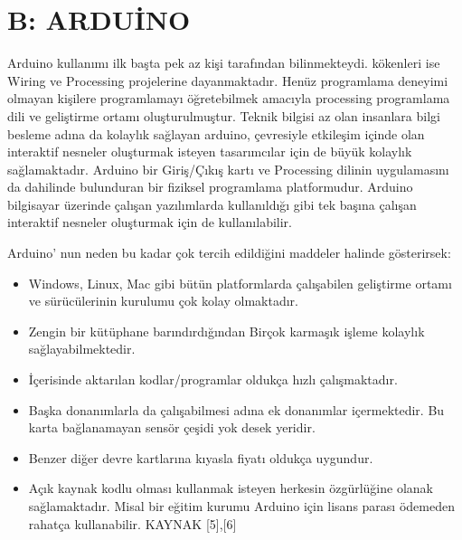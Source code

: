 \chapter{B: ARDUİNO}
\label{IkinciBolum}

	Arduino kullanımı ilk başta pek az kişi tarafından bilinmekteydi. kökenleri ise Wiring ve Processing projelerine dayanmaktadır. Henüz programlama deneyimi olmayan kişilere programlamayı öğretebilmek amacıyla processing programlama dili ve geliştirme ortamı oluşturulmuştur. 
    Teknik bilgisi az olan insanlara bilgi besleme adına da kolaylık sağlayan arduino, çevresiyle etkileşim içinde olan interaktif nesneler oluşturmak isteyen tasarımcılar için de büyük kolaylık sağlamaktadır.
    Arduino bir Giriş/Çıkış kartı ve Processing dilinin uygulamasını da dahilinde bulunduran bir fiziksel programlama platformudur. Arduino bilgisayar üzerinde çalışan yazılımlarda kullanıldığı gibi tek başına çalışan interaktif nesneler oluşturmak için de kullanılabilir.
    
	Arduino’ nun neden bu kadar çok tercih edildiğini maddeler halinde gösterirsek:  
    
\begin{itemize}
\item Windows, Linux, Mac gibi bütün platformlarda çalışabilen geliştirme ortamı ve sürücülerinin kurulumu çok kolay olmaktadır.  
\end{itemize}

\begin{itemize}
\item Zengin bir kütüphane barındırdığından Birçok karmaşık işleme kolaylık sağlayabilmektedir.
\end{itemize}
	
\begin{itemize}
\item İçerisinde aktarılan kodlar/programlar oldukça hızlı çalışmaktadır. 
\end{itemize}

\begin{itemize}
\item Başka donanımlarla da çalışabilmesi adına ek donanımlar içermektedir. Bu karta bağlanamayan sensör çeşidi yok desek yeridir.
\end{itemize}
    
\begin{itemize}
\item Benzer diğer devre kartlarına kıyasla fiyatı oldukça uygundur.
\end{itemize}
   
\begin{itemize}
\item Açık kaynak kodlu olması kullanmak isteyen herkesin özgürlüğine olanak sağlamaktadır. Misal bir eğitim kurumu Arduino için lisans parası ödemeden rahatça kullanabilir. KAYNAK [5],[6]
\end{itemize}


\clearpage